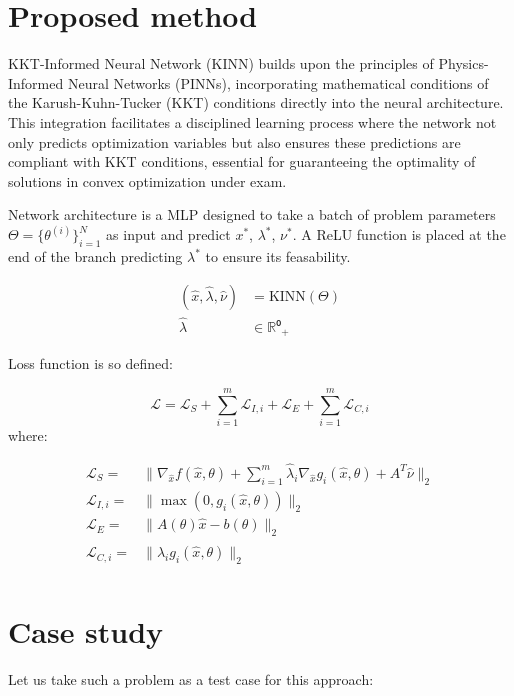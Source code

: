 \documentclass[
]{article}
\begin{document}
\section{Proposed method}\label{proposed-method}

KKT-Informed Neural Network (KINN) builds upon the principles of
Physics-Informed Neural Networks (PINNs), incorporating mathematical
conditions of the Karush-Kuhn-Tucker (KKT) conditions directly into the
neural architecture. This integration facilitates a disciplined learning
process where the network not only predicts optimization variables but
also ensures these predictions are compliant with KKT conditions,
essential for guaranteeing the optimality of solutions in convex
optimization under exam.

Network architecture is a MLP designed to take a batch of problem
parameters \(\Theta = \{\theta^{(i)}\}_{i=1}^N\) as input and predict
\(x^*\), \(\lambda^*\), \(\nu^*\). A ReLU function is placed at the end
of the branch predicting \(\lambda^*\) to ensure its feasability.

\begin{align}
(\hat{x}, \hat{\lambda}, \hat{\nu}) &= \textrm{KINN}(\Theta)\\
\hat{\lambda} &\in \mathbb{R}⁰_+
\end{align}

Loss function is so defined:

\[
\mathcal{L} = \mathcal{L}_S + \sum_{i=1}^m\mathcal{L}_{I,i} + \mathcal{L}_E  + \sum_{i=1}^m\mathcal{L}_{C,i} 
\] where:

\begin{align}
    \mathcal{L}_S =& \|\nabla_{\hat{x}} f(\hat{x}, \theta) + \sum\nolimits_{i=1}^m \hat{\lambda}_i\nabla_{\hat{x}} g_i(\hat{x}, \theta) + A^T\hat{\nu}\|_2\\ 
    \mathcal{L}_{I,i}  =& \|\max(0, g_i(\hat{x}, \theta))\|_2\\
    \mathcal{L}_E =& \|A(\theta) \hat{x} - b(\theta)\|_2\\
    \mathcal{L}_{C,i}  =& \|\hat{\lambda}_i g_i(\hat{x}, \theta)\|_2\\
\end{align}

\section{Case study}\label{case-study}

Let us take such a problem as a test case for this approach:
\end{document}
